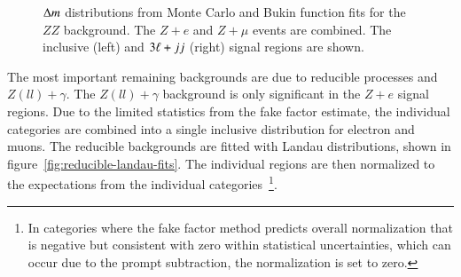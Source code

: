  
\begin{figure}[htbp]
    \centering
	\caption{$\Delta m$ distributions from Monte Carlo and Bukin function fits for the $ZZ$ background. The $Z+e$ and $Z+\mu$ events are combined. The inclusive (left) and $3\ell+jj$ (right) signal regions are shown.}
	\label{fig:ZZ-DiBosonFit}
\end{figure}



The most important remaining backgrounds are due to reducible processes and $Z(ll)+\gamma$. The $Z(ll)+\gamma$ background is only significant in the $Z+e$ signal regions. Due to the limited statistics from the fake factor estimate, the individual categories are combined into a single inclusive distribution for electron and muons. The reducible backgrounds are fitted with Landau distributions, shown in figure~\ref{fig:reducible-landau-fits}. The individual regions are then normalized to the expectations from the individual categories~\footnote{In categories where the fake factor method predicts overall normalization that is negative but consistent with zero within statistical uncertainties, which can occur due to the prompt subtraction, the normalization is set to zero.}.

